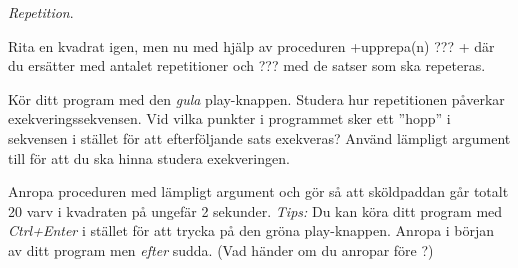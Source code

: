 %
%

\Task \textit{Repetition}.

\Subtask Rita en kvadrat igen, men nu med hjälp av proceduren \code+upprepa(n){ ??? }+ där du ersätter  med antalet repetitioner och ??? med de satser som ska repeteras.

\Subtask Kör ditt program med den \emph{gula} play-knappen. Studera hur repetitionen påverkar exekveringssekvensen. Vid vilka punkter i programmet sker ett ''hopp'' i sekvensen i stället för att efterföljande sats exekveras? Använd lämpligt argument till  för att du ska hinna studera exekveringen.

\Subtask Anropa proceduren  med lämpligt argument och gör så att sköldpaddan går totalt 20 varv i kvadraten på ungefär 2 sekunder. \emph{Tips:} Du kan köra ditt program med \emph{Ctrl+Enter} i stället för att trycka på den gröna play-knappen. Anropa  i början av ditt program men \emph{efter} sudda. (Vad händer om du anropar  före ?)

